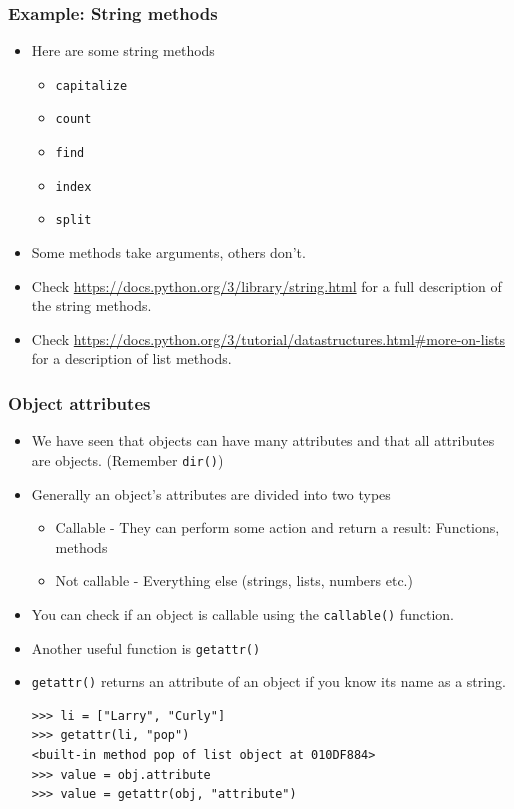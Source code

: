 \documentclass{beamer}
\begin{document}
\begin{frame}
\frametitle{Example: String methods}
\begin{itemize}
  \item Here are some string methods
  \begin{itemize}
    \item \texttt{capitalize}
    \item \texttt{count}
    \item \texttt{find}
    \item \texttt{index}
    \item \texttt{split}
  \end{itemize}
  \item Some methods take arguments, others don't.
  \item Check \url{https://docs.python.org/3/library/string.html} for a full description of the string methods.
  \item Check \url{https://docs.python.org/3/tutorial/datastructures.html\#more-on-lists} for a description of list methods.
\end{itemize}
\end{frame}

\begin{frame}[containsverbatim]
\frametitle{Object attributes}
\begin{itemize}
\item We have seen that objects can have many attributes and that all attributes are objects. (Remember \texttt{dir()})
\item Generally an object's attributes are divided into two types
\begin{itemize}
\item Callable - They can perform some action and return a result: Functions, methods
\item Not callable - Everything else (strings, lists, numbers etc.)
\end{itemize}
\item You can check if an object is callable using the \texttt{callable()} function.
\item Another useful function is \texttt{getattr()}
\item \texttt{getattr()} returns an attribute of an object if you know its name as a string.
\begin{lstlisting}
>>> li = ["Larry", "Curly"]
>>> getattr(li, "pop")           
<built-in method pop of list object at 010DF884>
>>> value = obj.attribute
>>> value = getattr(obj, "attribute")
\end{lstlisting}
\end{itemize}
\end{frame}
\end{document}
